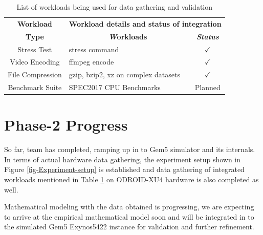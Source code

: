 \documentclass[conference]{IEEEtran}
\begin{document}
        \begin{table}[htbp]
            \caption{List of workloads being used for data gathering and validation}
            \begin{center}
                \begin{tabular}{|c|p{4cm}|c|}
                    \hline
                    \textbf{Workload}&\multicolumn{2}{|c|}{\textbf{Workload details and status  of integration}} \\
                    \cline{2-3} 
                    \textbf{Type} & \multicolumn{1}{|c|}{\textbf{\textit Workloads}} & \textbf{\textit{Status}} \\
                    \hline
                    Stress Test & stress command \cite{linux-stress-testing} & $\checkmark$ \\
                    \hline
                    Video Encoding & ffmpeg encode \cite{linux-stress-testing} & $\checkmark$ \\
                    \hline
                    File Compression & gzip, bzip2, xz on complex datasets \cite{compression-benchmarking} & $\checkmark$ \\
                    \hline
                    Benchmark Suite & SPEC2017 CPU Benchmarks \cite{10.1145/3185768.3185771} & Planned \\
                    \hline
                \end{tabular}
                \label{Workload-listing}
            \end{center}
        \end{table}

\section{Phase-2 Progress}
    \par So far, team has completed, ramping up in to Gem5 simulator and its internals. In terms of actual hardware data gathering, the experiment setup shown in Figure \ref{fig-Experiment-setup} is established and data gathering of integrated workloads mentioned in Table \ref{Workload-listing} on ODROID-XU4 hardware is also completed as well.

    \par Mathematical modeling with the data obtained is progressing, we are expecting to arrive at the empirical mathematical model soon and will be integrated in to the simulated Gem5 Exynos5422 instance for validation and further refinement.
\end{document}

